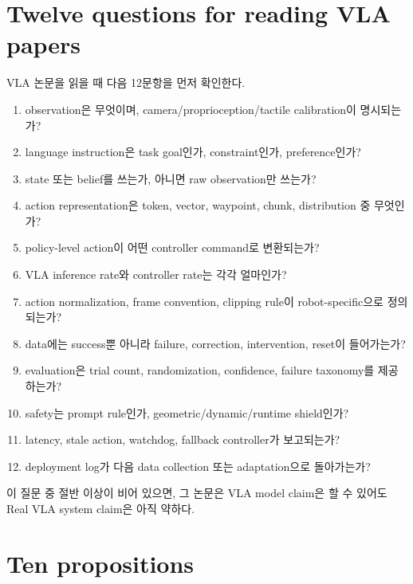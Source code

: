 \section{Twelve questions for reading VLA papers}

VLA 논문을 읽을 때 다음 12문항을 먼저 확인한다.
\begin{enumerate}
  \item observation은 무엇이며, camera/proprioception/tactile calibration이 명시되는가?
  \item language instruction은 task goal인가, constraint인가, preference인가?
  \item state 또는 belief를 쓰는가, 아니면 raw observation만 쓰는가?
  \item action representation은 token, vector, waypoint, chunk, distribution 중 무엇인가?
  \item policy-level action이 어떤 controller command로 변환되는가?
  \item VLA inference rate와 controller rate는 각각 얼마인가?
  \item action normalization, frame convention, clipping rule이 robot-specific으로 정의되는가?
  \item data에는 success뿐 아니라 failure, correction, intervention, reset이 들어가는가?
  \item evaluation은 trial count, randomization, confidence, failure taxonomy를 제공하는가?
  \item safety는 prompt rule인가, geometric/dynamic/runtime shield인가?
  \item latency, stale action, watchdog, fallback controller가 보고되는가?
  \item deployment log가 다음 data collection 또는 adaptation으로 돌아가는가?
\end{enumerate}

이 질문 중 절반 이상이 비어 있으면, 그 논문은 VLA model claim은 할 수 있어도 Real VLA system claim은 아직 약하다.

\section{Ten propositions}


